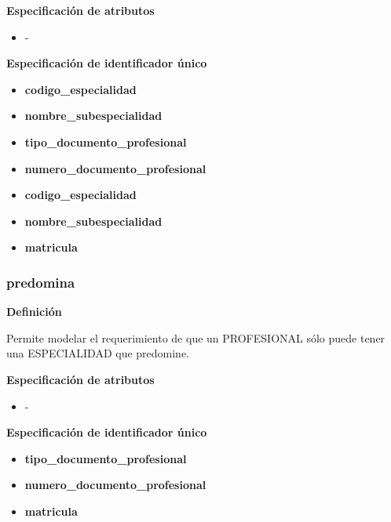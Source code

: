 \documentclass[a4paper,11pt]{article}
\begin{document}
\textbf{Especificación de atributos}

\begin{itemize}
\item -
\end{itemize}

\textbf{Especificación de identificador único}

\begin{itemize}

    \item \textbf{codigo\_especialidad}
   
    \item \textbf{nombre\_subespecialidad}

    \item \textbf{tipo\_documento\_profesional}

    \item \textbf{numero\_documento\_profesional}
	
    \item \textbf{codigo\_especialidad}
    
    \item \textbf{nombre\_subespecialidad}
    
    \item \textbf{matricula}
	
\end{itemize}

\subsubsection{\textbf{predomina}}

\textbf{Definición}

Permite modelar el requerimiento de que un PROFESIONAL sólo puede tener una ESPECIALIDAD 
que predomine.

\textbf{Especificación de atributos}

\begin{itemize}
\item -
\end{itemize}

\textbf{Especificación de identificador único}

\begin{itemize}

    \item \textbf{tipo\_documento\_profesional}

    \item \textbf{numero\_documento\_profesional}

    \item \textbf{matricula} 

\end{itemize}
\end{document}
